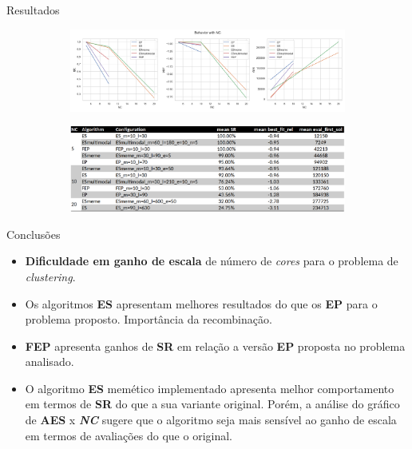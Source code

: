 \documentclass[pdf]{beamer}
\begin{document}
\begin{frame}{Resultados}
	\begin{figure}
		\begin{subfigure}[t]{\textwidth}
			\centering
			\includegraphics[width=\textwidth]{img/criteria_behavior_with_nc.png}
		\end{subfigure}
		\begin{subfigure}[t]{\textwidth}
			\centering
			\includegraphics[width=\textwidth]{img/tabela_resumo.png}
		\end{subfigure}
	\end{figure}
\end{frame}

\begin{frame}{Conclusões}
	\begin{itemize}
		\item \textbf{Dificuldade em ganho de escala} de número de \textit{cores} para o problema de \textit{clustering}.
		\item Os algoritmos \textbf{ES} apresentam melhores resultados do que os \textbf{EP} para o problema proposto. Importância da recombinação.
		\item \textbf{FEP} apresenta ganhos de \textbf{SR} em relação a versão \textbf{EP} proposta no problema analisado.
		\item O algoritmo \textbf{ES} memético implementado apresenta melhor comportamento em termos de \textbf{SR} do que a sua variante original. Porém, a análise do gráfico de \textbf{AES} x \textbf{\textit{NC}} sugere que o algoritmo seja mais sensível ao ganho de escala em termos de avaliações do que o original. 

	\end{itemize}
\end{frame}
\end{document}
